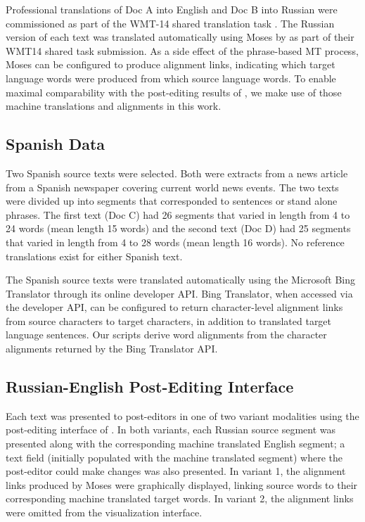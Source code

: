 Professional translations of Doc A into English and Doc B into Russian were commissioned as part of the WMT-14 shared translation task \citep{2014_WMT_Bojar_etal}.
%
%
The Russian version of each text was translated automatically using Moses \citep{2007_ACL_Koehn} by \citet{2014_WMT_Schwartz_etal} as part of their WMT14 shared task submission.
%
As a side effect of the phrase-based MT process, Moses can be configured to produce alignment links, indicating which target language words were produced from which source language words.
%
To enable maximal comparability with the post-editing results of \citet{2014_WMT_Schwartz_etal}, we make use of those machine translations and alignments in this work.



\subsection{Spanish Data}

Two Spanish source texts were selected. Both were extracts from a news article from a Spanish newspaper covering current world news events. 
%
The two texts were divided up into segments that corresponded to sentences or stand alone phrases. 
%
The first text (Doc C) had 26 segments that varied in length from 4 to 24 words (mean length 15 words) and the second text (Doc D) had 25 segments that varied in length from 4 to 28 words (mean length 16 words).
%
No reference translations exist for either Spanish text.

The Spanish source texts were translated automatically using the Microsoft Bing Translator through its online developer API.
%
Bing Translator, when accessed via the developer API, can be configured to return character-level alignment links from source characters to target characters, in addition to  translated target language sentences.
%
Our scripts derive word alignments from the character alignments returned by the Bing Translator API.









\subsection{Russian-English Post-Editing Interface}

Each text was presented to post-editors in one of two variant modalities using the post-editing interface of \citet{2014_WMT_Schwartz_etal}. 
%
In both variants, each Russian source segment was presented along with the corresponding machine translated English segment; a text field (initially populated with the machine translated segment) where the post-editor could make changes was also presented.
%
In variant 1, the alignment links produced by Moses were graphically displayed, linking source words to their corresponding machine translated target words.
%
In variant 2, the alignment links were omitted from the visualization interface.


